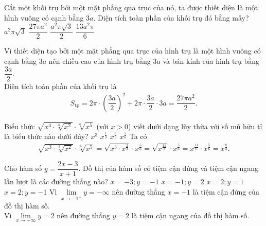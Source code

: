 \begin{ex}%
 Cắt một khối trụ bởi một mặt phẳng qua trục của nó, ta được thiết diện là một hình vuông có cạnh bằng $3a$. Diện tích toàn phần của khối trụ đó bằng mấy?
 \choice
  {$a^2 \pi \sqrt{3}$}
  {\True $\dfrac{27 \pi a^2}{2}$}
  {$\dfrac{a^2 \pi \sqrt{3}}{2}$}
  {$\dfrac{13a^2 \pi}{6}$}
 \loigiai
  {
  \immini
  {
  Vì thiết diện tạo bởi một mặt phẳng qua trục của hình trụ là một hình vuông có cạnh bằng $3a$ nên chiều cao của hình trụ bằng $3a$ và bán kính của hình trụ bằng $\dfrac{3a}{2}$.\\
  Diện tích toàn phần của khối trụ là
  \begin{eqnarray*}
   S_{\text{tp}} = 2\pi \cdot \left( \dfrac{3a}{2} \right)^2 + 2 \pi \cdot \dfrac{3a}{2} \cdot 3a = \dfrac{27 \pi a^2}{2}.
  \end{eqnarray*}
  }
  {
  }
  }
\end{ex}

\begin{ex}%
 Biểu thức $\sqrt{x^3 \cdot \sqrt[3]{x^2}} \cdot \sqrt[6]{x^5}$ (với $x > 0$) viết dưới dạng lũy thừa với số mũ hữu tỉ là biểu thức nào dưới đây?
 \choice
  {$x^3$}
  {$x^{\frac{1}{3}}$}
  {\True $x^{\frac{8}{3}}$}
  {$x^{\frac{5}{6}}$}
 \loigiai
  {
  Ta có
  \begin{eqnarray*}
   \sqrt{x^3 \cdot \sqrt[3]{x^2}} \cdot \sqrt[6]{x^5} = \sqrt{x^3 \cdot x^{\frac{2}{3}}} \cdot x^{\frac{5}{6}} = \sqrt{x^{\frac{11}{3}}} \cdot x^{\frac{5}{6}} = x^{\frac{11}{6}} \cdot x^{\frac{5}{6}} = x^{\frac{8}{3}}.
  \end{eqnarray*}
  }
\end{ex}

\begin{ex}%
 Cho hàm số $y = \dfrac{2x-3}{x+1}$. Đồ thị của hàm số có tiệm cận đứng và tiệm cận ngang lần lượt là các đường thẳng nào?
 \choice
  {$x = -3; y = -1$}
  {\True $x = -1; y = 2$}
  {$x = 2; y = 1$}
  {$x = 2; y = -1$}
 \loigiai
  {
  Vì $\lim\limits_{x \to -1^+} y = -\infty$ %
  nên đường thẳng $x = -1$ là tiệm cận đứng của đồ thị hàm số.\\
  Vì $\lim\limits_{x \to -\infty} y = 2$ %
  nên đường thẳng $y = 2$ là tiệm cận ngang của đồ thị hàm số.
  }
\end{ex}

